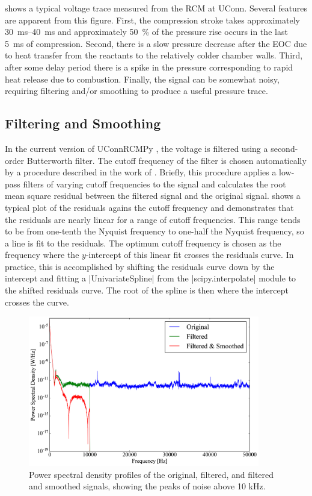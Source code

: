 \documentclass[12pt]{../ussci}
\begin{document}
 shows a typical voltage trace measured from the RCM at
UConn. Several features are apparent from this figure. First, the compression
stroke takes approximately \SIrange{30}{40}{\ms} and approximately
\SI{50}{\percent} of the pressure rise occurs in the last \SI{5}{\ms} of
compression. Second, there is a slow pressure decrease after the EOC due to
heat transfer from the reactants to the relatively colder chamber walls. Third,
after some delay period there is a spike in the pressure corresponding to rapid
heat release due to combustion. Finally, the signal can be somewhat noisy,
requiring filtering and/or smoothing to produce a useful pressure trace.

\subsection{Filtering and Smoothing}\label{filtering-and-smoothing}

In the current version of UConnRCMPy \autocite{uconnrcmpy}, the voltage is
filtered using a second-order Butterworth filter. The cutoff frequency of the
filter is chosen automatically by a procedure described in the work of
\textcite{Yu1999}. Briefly, this procedure applies a low-pass filters of
varying cutoff frequencies to the signal and calculates the root mean square
residual between the filtered signal and the original signal.
 shows a typical plot of the residuals agains the cutoff
frequency and demonstrates that the residuals are nearly linear for a range of
cutoff frequencies. This range tends to be from one-tenth the Nyquist frequency
to one-half the Nyquist frequency, so a line is fit to the residuals. The
optimum cutoff frequency is chosen as the frequency where the $y$-intercept of
this linear fit crosses the residuals curve. In practice, this is accomplished
by shifting the residuals curve down by the intercept and fitting a
|UnivariateSpline| from the
|scipy.interpolate| module \autocite{Jones2001} to the
shifted residuals curve. The root of the spline is then where the intercept
crosses the curve.

\begin{figure}[htbp]
\centering
\includegraphics[width=0.9\textwidth]{figures/frequency.png}
\caption{Power spectral density profiles of the original, filtered, and
filtered and smoothed signals, showing the peaks of noise above 10 kHz.}
\label{fig:frequency}
\end{figure}
\end{document}

